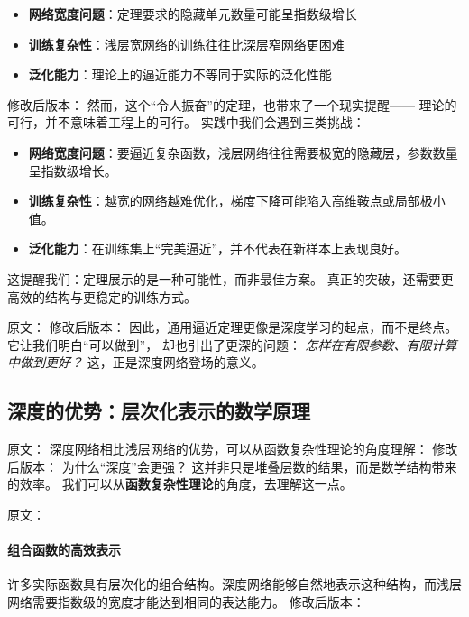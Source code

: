 \begin{itemize}
\item \textbf{网络宽度问题}：定理要求的隐藏单元数量可能呈指数级增长
\item \textbf{训练复杂性}：浅层宽网络的训练往往比深层窄网络更困难
\item \textbf{泛化能力}：理论上的逼近能力不等同于实际的泛化性能
\end{itemize}
修改后版本：
然而，这个“令人振奋”的定理，也带来了一个现实提醒——  
理论的可行，并不意味着工程上的可行。  
实践中我们会遇到三类挑战：

\begin{itemize}
\item \textbf{网络宽度问题}：要逼近复杂函数，浅层网络往往需要极宽的隐藏层，参数数量呈指数级增长。
\item \textbf{训练复杂性}：越宽的网络越难优化，梯度下降可能陷入高维鞍点或局部极小值。
\item \textbf{泛化能力}：在训练集上“完美逼近”，并不代表在新样本上表现良好。
\end{itemize}

这提醒我们：定理展示的是一种可能性，而非最佳方案。  
真正的突破，还需要更高效的结构与更稳定的训练方式。



原文：
修改后版本：
因此，通用逼近定理更像是深度学习的起点，而不是终点。  
它让我们明白“可以做到”，  
却也引出了更深的问题：  
\textit{怎样在有限参数、有限计算中做到更好？}  
这，正是深度网络登场的意义。

\subsection{深度的优势：层次化表示的数学原理}

原文：
深度网络相比浅层网络的优势，可以从函数复杂性理论的角度理解：
修改后版本：
为什么“深度”会更强？  
这并非只是堆叠层数的结果，而是数学结构带来的效率。  
我们可以从\textbf{函数复杂性理论}的角度，去理解这一点。



原文：
\paragraph{组合函数的高效表示}
许多实际函数具有层次化的组合结构。深度网络能够自然地表示这种结构，而浅层网络需要指数级的宽度才能达到相同的表达能力。
修改后版本：
